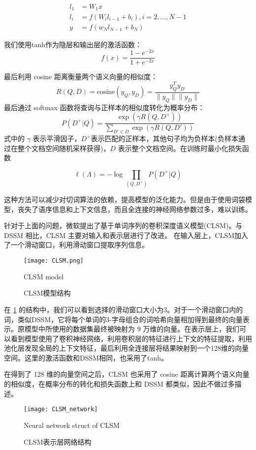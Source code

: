 $$
\begin{aligned}
l_1 &= W_1x\\
l_i &= f(W_il_{i-1} + b_i), i=2,...,N-1\\
y &= f(w_Nl_{N-1} + b_N)
\end{aligned}
$$

我们使用tanh作为隐层和输出层的激活函数：
$$
f(x) = \frac{1-e^{-2x}}{1+e^{-2x}}
$$

最后利用 cosine 距离衡量两个语义向量的相似度：
$$
R(Q, D) = \text{cosine}(y_Q,y_D) = \frac{y_Q^Ty_D}{\|y_Q\|\|y_D\|}
$$
最后通过 softmax 函数将查询与正样本的相似度转化为概率分布：
$$
P(D^+|Q) = \frac{\exp\left(\gamma R(Q, D^+)\right)}{\sum_{D'\in D}\exp\left(\gamma R(Q, D')\right)}
$$
式中的 $\gamma$ 表示平滑因子，$D^+$表示匹配的正样本，其他句子均为负样本(负样本通过在整个文档空间随机采样获得)，$D$ 表示整个文档空间。在训练时最小化损失函数

$$
\ell(\Lambda) = -\log \prod_{(Q,D^+)} P(D^+|Q)
$$

这种方法可以减少对切词算法的依赖，提高模型的泛化能力。但是由于使用词袋模型，丧失了语序信息和上下文信息，而且全连接的神经网络参数过多，难以训练。

针对于上面的问题，微软提出了基于单词序列的卷积深度语义模型(CLSM)\cite{Shen2014ALS}。与 DSSM 相比，CLSM 主要对输入和表示层进行了改进。
在输入层上，CLSM加入了一个滑动窗口，利用滑动窗口提取序列信息。

\begin{figure}[!htbp]\centering
  \texttt{[image: CLSM.png]}
  \caption{CLSM模型结构}{CLSM model}
  \label{fig:CLSM}       %
\end{figure}

在 \ref{fig:CLSM} 的结构中，我们可以看到选择的滑动窗口大小为3。对于一个滑动窗口内的词，类似DSSM，它将每个单词的3-字母组合的词哈希向量相加得到最终的向量表示。原模型中所使用的数据集最终被映射为 9 万维的向量。在表示层上，我们可以看到模型使用了卷积神经网络，利用卷积层的特征进行上下文的特征提取，利用池化层发现全局的上下文特征，最后利用全连接层将结果映射到一个128维的向量空间。这里的激活函数和DSSM相同，也采用了tanh。

在得到了 128 维的向量空间之后，CLSM 也采用了 cosine 距离计算两个语义向量的相似度，在概率分布的转化和损失函数上和 DSSM 都类似，因此不做过多描述。

\begin{figure}[!htbp]\centering
  \texttt{[image: CLSM\_network]}
  \caption{CLSM表示层网络结构}{Neural network struct of CLSM}
  \label{fig:CLSM_network}       %
\end{figure}

